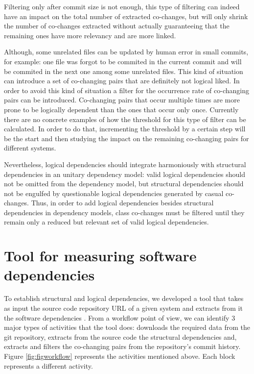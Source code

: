 Filtering only after commit size is not enough, this type of filtering can indeed have an impact on the total number of extracted co-changes, but will only shrink the number of co-changes extracted without actually guaranteeing that the remaining ones have more relevancy and are more linked.

Although, some unrelated files can be updated by human error in small commits, for example: one file was forgot to be commited in the current commit and will be commited in the next one among some unrelated files. This kind of situation can introduce a set of co-changing pairs that are definitely not logical liked. In order to avoid this kind of situation a filter for the occurrence rate of co-changing pairs can be introduced. Co-changing pairs that occur multiple times are more prone to be logically dependent than the ones that occur only once. Currently there are no concrete examples of how the threshold for this type of filter can be calculated. In order to do that, incrementing the threshold by a certain step will be the start and then studying the impact on the remaining co-changing pairs for different systems. 

Nevertheless, logical dependencies should integrate harmoniously with structural dependencies in an unitary dependency model: valid logical dependencies should not be omitted from the dependency model, but structural dependencies should not be engulfed by questionable logical dependencies generated by casual co-changes.  Thus, in order to add logical dependencies besides structural dependencies in dependency models, class co-changes must be filtered until they remain only a reduced but relevant set of valid logical dependencies. 

\section{Tool for measuring software dependencies}
\label{sec:tool}

To establish structural and logical dependencies, we developed a tool that takes as input the source code repository URL of a given system and extracts from it the software dependencies \cite{DepSACI}. 
From a workflow point of view, we can identify 3 major types of activities that the tool does: downloads the required data from the git repository, extracts from the source code the structural dependencies and, extracts and filters the co-changing pairs from the repository's commit history. Figure \ref{fig:figworkflow} represents the activities mentioned above. Each block represents a different activity. 

